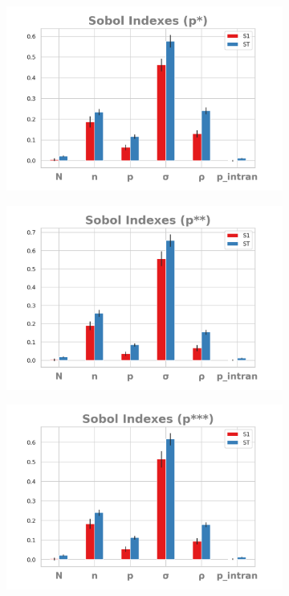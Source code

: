 \documentclass{article}
\begin{document}
    \begin{figure}[H]
  \centering
  
    \begin{subfigure}[b]{0.45\textwidth}
      \includegraphics[width=\textwidth]{img/sobolpstar1.png}
    \end{subfigure}
    \begin{subfigure}[b]{0.45\textwidth}
      \includegraphics[width=\textwidth]{img/sobolpstar2.png}
     \end{subfigure}
     \begin{subfigure}[b]{0.5\textwidth}
       \includegraphics[width=\textwidth]{img/sobolpstar3.png}

\end{subfigure}
\end{figure}
\end{document}
